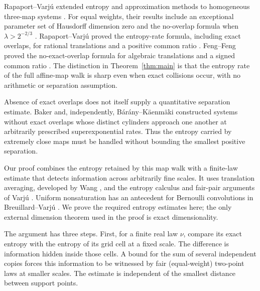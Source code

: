 Rapaport--Varj\'u extended entropy and approximation methods to
homogeneous three-map systems \cite{RapaportVarju2024}.
For equal weights, their results include an exceptional parameter set
of Hausdorff dimension zero and the no-overlap formula when $\lambda>2^{-2/3}$
\cite[Corollary~1.4 and Theorem~1.8]{RapaportVarju2024}.
Rapaport--Varj\'u proved the entropy-rate formula, including exact overlaps,
for rational translations and a positive common ratio
\cite[Theorem~A.1]{RapaportVarju2024}.  Feng--Feng proved the
no-exact-overlap formula for algebraic translations and a signed common ratio
\cite[Theorem~1.2]{FengFeng2025}.
The distinction in Theorem~\ref{thm:main} is that the entropy rate of
the full affine-map walk is sharp even when exact collisions occur,
with no arithmetic or separation assumption.

Absence of exact overlaps does not itself supply a quantitative
separation estimate.  Baker \cite[Theorem~1.3]{Baker2021} and,
independently, B\'ar\'any--K\"aenm\"aki
\cite[Theorem~2.1]{BaranyKaenmaki2021} constructed systems without
exact overlaps whose distinct cylinders approach one another at
arbitrarily prescribed superexponential rates.
Thus the entropy carried by extremely close maps must be handled
without bounding the smallest positive separation.

Our proof combines the entropy retained by this map walk with a
finite-law estimate that detects information across arbitrarily fine scales.
It uses translation averaging, developed by Wang
\cite[Section~4.1]{Wang2011}, and the entropy calculus and fair-pair
arguments of Varj\'u
\cite[Section~2.2, Propositions~20--21, and Lemma~22]{VarjuAbsolute2019}.
Uniform nonsaturation has an antecedent for Bernoulli convolutions in
Breuillard--Varj\'u \cite[Lemma~13]{BreuillardVarju2019}.
We prove the required entropy estimates here; the only external
dimension theorem used in the proof is exact dimensionality.

The argument has three steps.
First, for a finite real law $\nu$, compare its exact entropy with
the entropy of its grid cell at a fixed scale.  The difference is
information hidden inside those cells.  A bound for the sum of several
independent copies forces this information to be witnessed by fair
(equal-weight) two-point laws at smaller scales.  The estimate is independent of the smallest
distance between support points.

